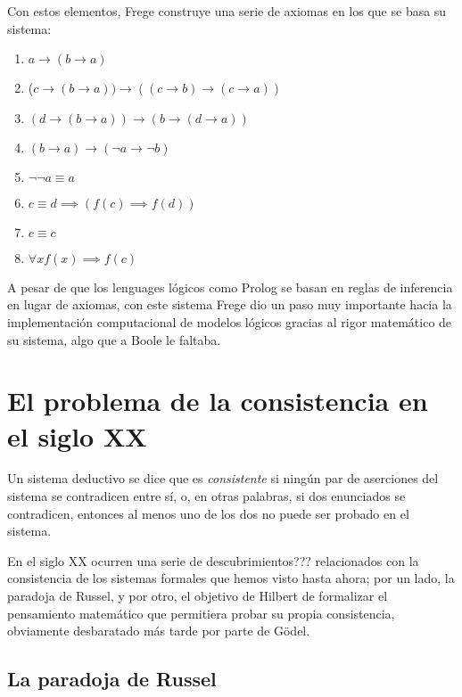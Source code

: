 \documentclass{article}
\begin{document}
Con estos elementos, Frege construye una serie de axiomas en los que se basa su sistema\cite{sullivan2004frege}:

\begin{enumerate}
    \item $a \rightarrow (b \rightarrow a)$
    \item ($c \rightarrow (b \rightarrow a)) \rightarrow ((c \rightarrow b) \rightarrow (c \rightarrow a))$
    \item $(d \rightarrow (b \rightarrow a)) \rightarrow (b \rightarrow (d \rightarrow a))$
    \item $(b \rightarrow a) \rightarrow (\lnot a \rightarrow \lnot b)$
    \item $\lnot \lnot a \equiv a$
    \item $c \equiv d \implies (f(c) \implies f(d))$
    \item $c \equiv c$
    \item $\forall x f(x) \implies f(c)$
\end{enumerate}

A pesar de que los lenguages lógicos como Prolog se basan en reglas de inferencia en lugar de axiomas, con este sistema Frege dio un paso muy importante hacia la implementación computacional de modelos lógicos gracias al rigor matemático de su sistema, algo que a Boole le faltaba.

\section{El problema de la consistencia en el siglo XX}

Un sistema deductivo se dice que es \textit{consistente} si ningún par de aserciones del sistema se contradicen entre sí, o, en otras palabras, si dos enunciados se contradicen, entonces al menos uno de los dos no puede ser probado en el sistema\cite{tarski1994introduction}.

En el siglo XX ocurren una serie de descubrimientos??? relacionados con la consistencia de los sistemas formales que hemos visto hasta ahora; por un lado, la paradoja de Russel, y por otro, el objetivo de Hilbert de formalizar el pensamiento matemático que permitiera probar su propia consistencia, obviamente desbaratado más tarde por parte de Gödel.

\subsection{La paradoja de Russel}
\end{document}
